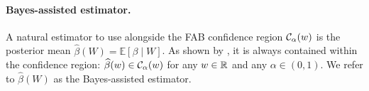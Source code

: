 \paragraph{Bayes-assisted estimator.} A natural estimator to use alongside the FAB confidence region $\mathcal C_\alpha(w)$ is the posterior mean $\widehat{\beta}(W) = \mathbb{E}[\beta\mid W]$. As shown by \citep[Theorem~2.1]{Cortinovis2024}, it is always contained within the confidence region: $\widehat{\beta}(w)\in  \mathcal C_\alpha(w)$ for any $w\in\mathbb R$ and any $\alpha\in(0,1)$. We refer to $\widehat{\beta}(W)$ as the Bayes-assisted estimator.
